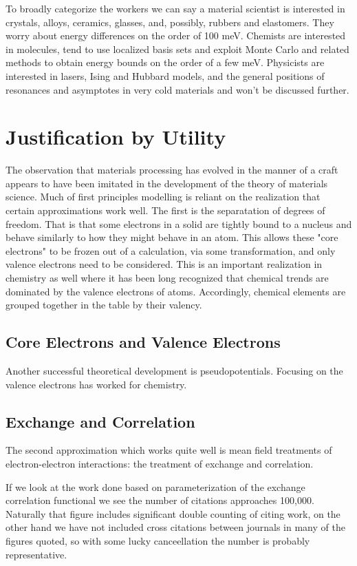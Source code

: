 To broadly categorize the workers we can say a material scientist 
is interested in crystals, alloys, ceramics, glasses, and, possibly, rubbers and elastomers. They
worry about energy differences on the order of 100 meV. Chemists are interested in molecules, 
tend to use localized basis sets and exploit Monte Carlo and related methods to obtain energy 
bounds on the order of a few meV. Physicists are interested in lasers, Ising and Hubbard models, and the 
general positions of resonances and asymptotes in very cold materials and won't be discussed further. 

\section{Justification by Utility}
The observation that materials processing has evolved in the manner 
of a craft appears to have been imitated in the development of the 
theory of materials science. Much of first principles modelling is reliant on
the realization that certain approximations work well. The first is 
the separatation of degrees of freedom. That is that some electrons in a solid are
tightly bound to a nucleus and behave similarly to how they might behave in an atom.
This allows these "core electrons" to be frozen out of a calculation, via some transformation,
and only valence electrons need to be considered. This is an important realization in
chemistry as well where it has been long recognized that chemical trends are dominated by
the valence electrons of atoms. Accordingly, chemical elements are grouped together in the table 
by their valency. 

\subsection{Core Electrons and Valence Electrons}
Another successful theoretical development is pseudopotentials. Focusing on the valence electrons 
has worked for chemistry.

\subsection{Exchange and Correlation}
The second approximation which works quite well is mean field treatments of 
electron-electron interactions: the treatment of exchange and correlation. 

If we look at the work done based on parameterization of the exchange correlation functional 
we see the number of citations approaches 100,000. Naturally that figure includes significant 
double counting of citing work, on the other hand  we have not included cross citations between journals in many of the 
figures quoted, so with some lucky canceellation the number is probably representative. 

